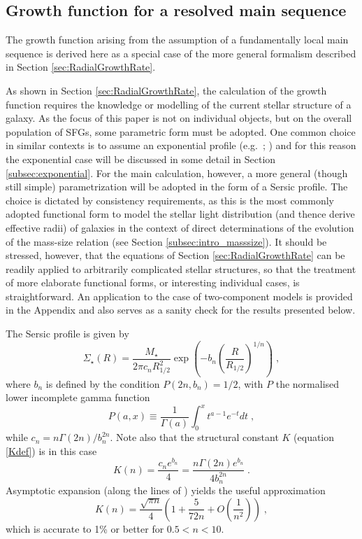 \documentclass[fleqn,usenatbib]{mnras}
\begin{document}
\subsection{Growth function for a resolved main sequence}\label{subsec:growthfunctionmainsequence}

The growth function arising from the assumption of a fundamentally local main sequence is derived here as a special case of the more general formalism described in Section \ref{sec:RadialGrowthRate}.

As shown in Section \ref{sec:RadialGrowthRate}, the calculation of the growth function requires the knowledge or modelling of the current stellar structure of a galaxy. As the focus of this paper is not on individual objects, but on the overall population of SFGs, some parametric form must be adopted. One common choice in similar contexts is to assume an exponential profile (e.g.\ \citealt{MM07}; \citealt{Wilman+20}) and for this reason the exponential case will be discussed in some detail in Section \ref{subsec:exponential}. For the main calculation, however, a more general (though still simple) parametrization will be adopted in the form of a Sersic profile. The choice is dictated by consistency requirements, as this is the most commonly adopted functional form to model the stellar light distribution (and thence derive effective radii) of galaxies in the context of direct determinations of the evolution of the mass-size relation (see Section \ref{subsec:intro_masssize}). It should be stressed, however, that the equations of Section \ref{sec:RadialGrowthRate} can be readily applied to arbitrarily complicated stellar structures, so that the treatment of more elaborate functional forms, or interesting individual cases, is straightforward. An application to the case of two-component models is provided in the Appendix and also serves as a sanity check for the results presented below.

The Sersic profile is given by
\begin{equation}\label{Sersic}
\Sigma_\star (R) = \frac{M_\star}{2 \pi c_n R_{1/2}^2} \exp \left( - b_n \left( \frac{R}{R_{1/2}} \right)^{1/n} \right) \; ,
\end{equation}
where $b_n$ is defined by the condition $P(2n, b_n) = 1/2$, with $P$ the normalised lower incomplete gamma function
\begin{equation}
P(a, x) \equiv \frac{1}{\Gamma(a)} \int_0^x t^{a-1} e^{-t} dt \; ,
\end{equation}
while $c_n = n \Gamma(2n)/b_n^{2n}$. Note also that the structural constant $K$ (equation \ref{Kdef}) is in this case
\begin{equation}\label{KSersic}
K(n) = \frac{c_n e^{b_n}}{4} = \frac{n \Gamma(2n) e^{b_n}}{4 b_n^{2n}} \;.
\end{equation}
Asymptotic expansion (along the lines of \citealt{CiottiBertin1999}) yields the useful approximation
\begin{equation}\label{Kapprox}
K(n) = \frac{\sqrt{\pi n}}{4} \left( 1 + \frac{5}{72 n} + O \left( \frac{1}{n^2} \right) \right) \;,
\end{equation}
which is accurate to 1\% or better for $0.5 < n < 10$.
\end{document}
